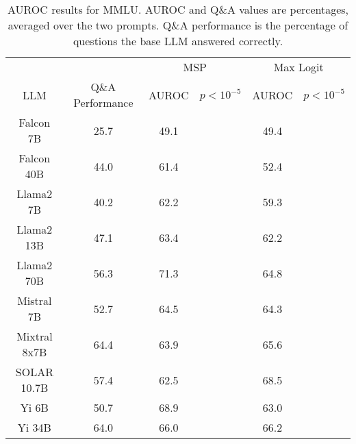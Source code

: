 \begin{table*}
\centering
\begin{tabular}{c|c|c|c|c|c}
& & \multicolumn{2}{c|}{MSP} & \multicolumn{2}{c}{Max Logit} \\ 
LLM & Q\&A Performance & AUROC & $p < 10^{-5}$ & AUROC & $p < 10^{-5}$\\ \hline
Falcon 7B & 25.7 & 49.1 &  & 49.4 & \\
Falcon 40B & 44.0 & 61.4 &  & 52.4 & \\
Llama2 7B & 40.2 & 62.2 &  & 59.3 & \\
Llama2 13B & 47.1 & 63.4 &  & 62.2 & \\
Llama2 70B & 56.3 & 71.3 &  & 64.8 & \\
Mistral 7B & 52.7 & 64.5 &  & 64.3 & \\
Mixtral 8x7B & 64.4 & 63.9 &  & 65.6 & \\
SOLAR 10.7B & 57.4 & 62.5 &  & 68.5 & \\
Yi 6B & 50.7 & 68.9 &  & 63.0 & \\
Yi 34B & 64.0 & 66.0 &  & 66.2 & \\
\hline
\end{tabular}
\caption{AUROC results for MMLU. AUROC and Q\&A values are percentages, averaged over the two prompts. Q\&A performance is the percentage of questions the base LLM answered correctly.}
\label{tab:mmlu_auroc}
\end{table*}
